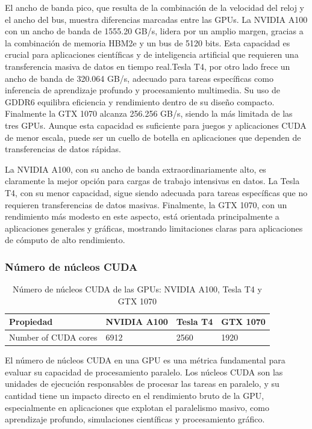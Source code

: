 \documentclass{article}
\begin{document}
			El ancho de banda pico, que resulta de la combinación de la velocidad del reloj y el ancho del bus, muestra diferencias marcadas entre las GPUs. La NVIDIA A100 con un ancho de banda de 1555.20 GB/s, lidera por un amplio margen, gracias a la combinación de memoria HBM2e y un bus de 5120 bits. Esta capacidad es crucial para aplicaciones científicas y de inteligencia artificial que requieren una transferencia masiva de datos en tiempo real.Tesla T4, por otro lado frece un ancho de banda de 320.064 GB/s, adecuado para tareas específicas como inferencia de aprendizaje profundo y procesamiento multimedia. Su uso de GDDR6 equilibra eficiencia y rendimiento dentro de su diseño compacto. Finalmente la GTX 1070 alcanza 256.256 GB/s, siendo la más limitada de las tres GPUs. Aunque esta capacidad es suficiente para juegos y aplicaciones CUDA de menor escala, puede ser un cuello de botella en aplicaciones que dependen de transferencias de datos rápidas.

			La NVIDIA A100, con su ancho de banda extraordinariamente alto, es claramente la mejor opción para cargas de trabajo intensivas en datos. La Tesla T4, con su menor capacidad, sigue siendo adecuada para tareas específicas que no requieren transferencias de datos masivas. Finalmente, la GTX 1070, con un rendimiento más modesto en este aspecto, está orientada principalmente a aplicaciones generales y gráficas, mostrando limitaciones claras para aplicaciones de cómputo de alto rendimiento.

		\subsubsection{Número de núcleos CUDA}

			\begin{table}[H]
				\begin{adjustbox}{width=\textwidth, keepaspectratio}
					\begin{tabular}{|l|l|l|l|}
						\hline
						\textbf{Propiedad} & \textbf{NVIDIA A100} & \textbf{Tesla T4} & \textbf{GTX 1070} \\ \hline
						Number of CUDA cores & 6912 & 2560 & 1920 \\ \hline
					\end{tabular}
				\end{adjustbox}
				\centering
				\caption{Número de núcleos CUDA de las GPUs: NVIDIA A100, Tesla T4 y GTX 1070}
			\end{table}

			El número de núcleos CUDA en una GPU es una métrica fundamental para evaluar su capacidad de procesamiento paralelo. Los núcleos CUDA son las unidades de ejecución responsables de procesar las tareas en paralelo, y su cantidad tiene un impacto directo en el rendimiento bruto de la GPU, especialmente en aplicaciones que explotan el paralelismo masivo, como aprendizaje profundo, simulaciones científicas y procesamiento gráfico.
\end{document}
